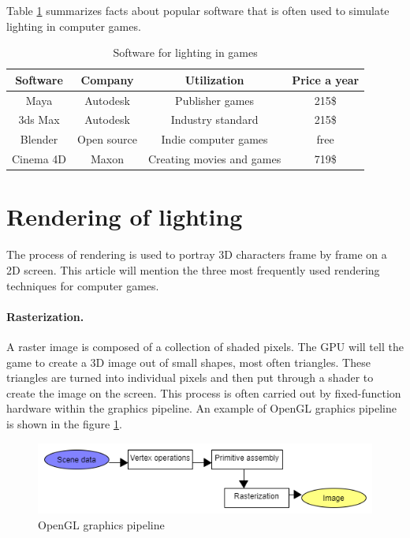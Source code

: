 \documentclass[10pt,twoside,english,a4paper]{article}
\begin{document}
Table \ref{table} summarizes facts about popular software that is often used to simulate lighting in computer games. 
\begin{table}[h!]
\begin{center}
 \begin{tabular}{|c||c|c|c|} 
 \hline
 Software & Company & Utilization & Price a year \\ 
 \hline\hline
 Maya & Autodesk & Publisher games & 215\$ \\ 
 \hline
 3ds Max & Autodesk & Industry standard & 215\$ \\
 \hline
 Blender & Open source & Indie computer games & free \\
 \hline
 Cinema 4D & Maxon & Creating movies and games & 719\$ \\
 \hline
\end{tabular}
\end{center}
\caption{Software for lighting in games\cite{software}}
\label{table}
\end{table}

\section{Rendering of lighting} \label{fifth}
The process of rendering is used to portray 3D characters frame by frame on a 2D screen. This article will mention the three most frequently used rendering techniques for computer games.

\paragraph{Rasterization.}
A raster image is composed of a collection of shaded pixels. The GPU will tell the game to create a 3D image out of small shapes, most often triangles. These triangles are turned into individual pixels and then put through a shader to create the image on the screen. This process is often carried out by fixed-function hardware within the graphics pipeline.\cite{wang}
An example of OpenGL graphics pipeline is shown in the figure \ref{fig:diag2}.

\begin{figure}[ht]
    \centering
    \includegraphics[scale=0.5]{diag_gr.png}
    \caption{OpenGL graphics pipeline\cite{software}}
    \label{fig:diag2}
\end{figure}
\end{document}
